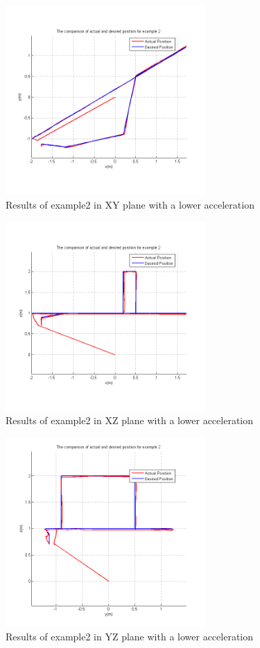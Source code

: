 \begin{figure}[H]
  \centering
  \includegraphics[width=3in]{Ex2_1_XY.PNG}
  \caption{Results of example2 in XY plane with a lower acceleration}
\end{figure}

\begin{figure}[H]
  \centering
  \includegraphics[width=3in]{Ex2_1_XZ.PNG}
  \caption{Results of example2 in XZ plane with a lower acceleration}
\end{figure}

\begin{figure}[H]
  \centering
  \includegraphics[width=3in]{Ex2_1_YZ.PNG}
  \caption{Results of example2 in YZ plane with a lower acceleration}
\end{figure}

